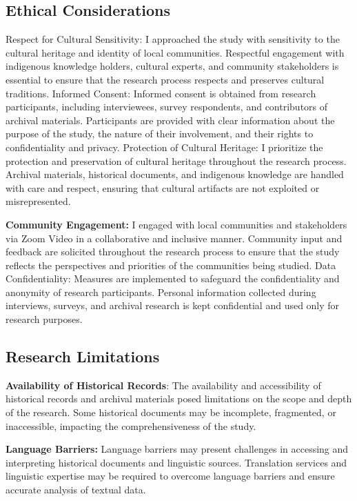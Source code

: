 \subsection{Ethical Considerations}
Respect for Cultural Sensitivity: I approached the study with sensitivity to the cultural heritage and identity of local communities. Respectful engagement with indigenous knowledge holders, cultural experts, and community stakeholders is essential to ensure that the research process respects and preserves cultural traditions.
Informed Consent: Informed consent is obtained from research participants, including interviewees, survey respondents, and contributors of archival materials. Participants are provided with clear information about the purpose of the study, the nature of their involvement, and their rights to confidentiality and privacy.
Protection of Cultural Heritage: I prioritize the protection and preservation of cultural heritage throughout the research process. Archival materials, historical documents, and indigenous knowledge are handled with care and respect, ensuring that cultural artifacts are not exploited or misrepresented.

\textbf{Community Engagement:} I engaged with local communities and stakeholders via Zoom Video in a collaborative and inclusive manner. Community input and feedback are solicited throughout the research process to ensure that the study reflects the perspectives and priorities of the communities being studied.
Data Confidentiality: Measures are implemented to safeguard the confidentiality and anonymity of research participants. Personal information collected during interviews, surveys, and archival research is kept confidential and used only for research purposes.
\subsection*{Research Limitations}
\textbf{Availability of Historical Records}: The availability and accessibility of historical records and archival materials posed limitations on the scope and depth of the research. Some historical documents may be incomplete, fragmented, or inaccessible, impacting the comprehensiveness of the study.


\textbf{Language Barriers:} Language barriers may present challenges in accessing and interpreting historical documents and linguistic sources. Translation services and linguistic expertise may be required to overcome language barriers and ensure accurate analysis of textual data.


